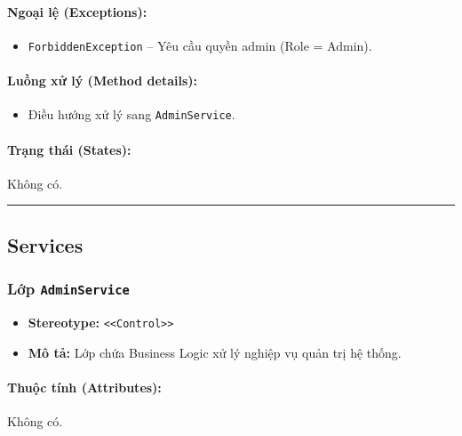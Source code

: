 \documentclass[12pt,a4paper]{article}
\begin{document}
\paragraph{Ngoại lệ (Exceptions):}
\begin{itemize}[leftmargin=*]
    \item \texttt{ForbiddenException} – Yêu cầu quyền admin (Role = Admin).
\end{itemize}


\paragraph{Luồng xử lý (Method details):}
\begin{itemize}[leftmargin=*]
    \item Điều hướng xử lý sang \texttt{AdminService}.
\end{itemize}


\paragraph{Trạng thái (States):}
Không có.

\vskip 0.5cm
\noindent\rule{\textwidth}{0.5pt}
\vskip 0.5cm

\subsection{Services}

\subsubsection{Lớp \texttt{AdminService}}
\begin{itemize}[leftmargin=*]
    \item \textbf{Stereotype:} \texttt{\textless{}\textless{}Control\textgreater{}\textgreater{}}
    \item \textbf{Mô tả:} Lớp chứa Business Logic xử lý nghiệp vụ quản trị hệ thống.
\end{itemize}

\paragraph{Thuộc tính (Attributes):}
Không có.
\end{document}
